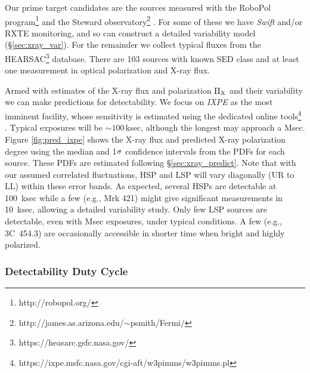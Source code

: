 Our prime target candidates are the sources measured with the RoboPol 
program\footnote{http://robopol.org/} \citep{pavlidou_robopol_2014,blinov_robopol:_2018} and the Steward 
observatory\footnote{http://james.as.arizona.edu/$\sim$psmith/Fermi/} \citep{smith_coordinated_2009}. 
For some of these we have {\it Swift} and/or RXTE monitoring, and so can construct a detailed
variability model (\S \ref{sec:xray_var}). For the remainder we collect typical fluxes from
the HEARSAC\footnote{https://heasarc.gsfc.nasa.gov/} database. There are 103 
sources with known SED class and at least one measurement in optical polarization and X-ray flux.

	Armed with estimates of the X-ray flux and polarization $\rm \Pi_X$ and their variability
we can make predictions for detectability. We focus on {\it IXPE} as the most imminent facility, whose
sensitivity is estimated using the dedicated online tools\footnote{https://ixpe.msfc.nasa.gov/cgi-aft/w3pimms/w3pimms.pl} \citep{soffitta_ixpe_2017,odell_imaging_2018}. Typical exposures will be $\sim 100\,$ksec, although the longest may approach a Msec. Figure 
\ref{fig:pred_ixpe} shows the X-ray flux and predicted X-ray polarization degree using the median 
and 1$\rm \sigma$ confidence intervals from the PDFs for each source. These PDFs are
estimated following \S\ref{sec:xray_predict}. Note that with our assumed 
correlated fluctuations, HSP and LSP will vary diagonally (UR to LL) within these error bands.
As expected, several HSPs are detectable at 100~ksec while a few (e.g., Mrk 421) might give
significant measurements in 10~ksec, allowing a detailed variability study. Only few LSP sources
are detectable, even with Msec exposures, under typical conditions.  A few 
(e.g., 3C~454.3) are occasionally accessible in shorter time when bright 
and highly polarized.


\subsubsection{Detectability Duty Cycle}
\label{sec:duty_cycle}

